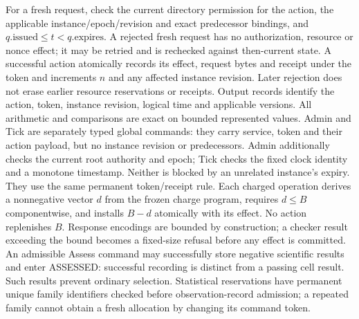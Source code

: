 For a fresh request, check the current directory permission for the action,
the applicable instance/epoch/revision and exact predecessor bindings,
and $q.\mathrm{issued}\le t<q.\mathrm{expires}$. A rejected fresh request
has no authorization, resource or nonce effect; it may be retried and is
rechecked against then-current state. A successful action atomically
records its effect, request bytes and receipt under the token and increments
$n$ and any affected instance revision. Later rejection does not erase
earlier resource reservations or receipts. Output records identify the
action, token, instance revision, logical time and applicable versions.
All arithmetic and comparisons are exact on bounded represented values.
Admin and Tick are separately typed global commands: they carry service,
token and their action payload, but no instance revision or predecessors.
Admin additionally checks the current root authority and epoch; Tick
checks the fixed clock identity and a monotone timestamp. Neither is
blocked by an unrelated instance's expiry. They use the same permanent
token/receipt rule. Each charged operation derives a nonnegative vector
$d$ from the frozen charge program, requires $d\le B$ componentwise,
and installs $B-d$ atomically with its effect. No action replenishes $B$.
Response encodings are bounded by construction; a checker result exceeding
the bound becomes a fixed-size refusal before any effect is committed.
An admissible Assess command may successfully store negative scientific
results and enter ASSESSED: successful recording is distinct from a passing
cell result. Such results prevent ordinary selection.
Statistical reservations have permanent unique family identifiers checked
before observation-record admission; a repeated family cannot obtain a
fresh allocation by changing its command token.

